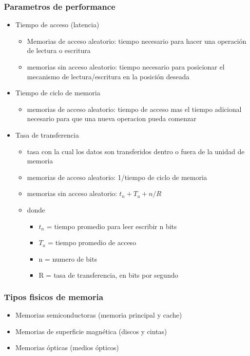 \subsubsection{Parametros de performance}
	\begin{itemize}
	\item Tiempo de acceso (latencia)
		\begin{itemize}
		\item Memorias de acceso aleatorio: tiempo necesario para hacer una operación de lectura o escritura
		\item memorias sin acceso aleatorio: tiempo necesario para posicionar el mecanismo de lectura/escritura en la posición deseada
		\end{itemize}
	\item Tiempo de ciclo de memoria
		\begin{itemize}
		\item memorias de acceso aleatorio: tiempo de acceso mas el tiempo adicional necesario para que una nueva operacion pueda comenzar
		\end{itemize}
	\item Tasa de transferencia
		\begin{itemize}
		\item tasa con la cual los datos son transferidos dentro o fuera de la unidad de memoria
		\item memorias de acceso aleatorio: 1/tiempo de ciclo de memoria
		\item memorias sin acceso aleatorio: $t_n+T_a+n/R$
		\item donde
			\begin{itemize}
			\item $t_n$ = tiempo promedio para leer escribir n bits
			\item $T_a$ = tiempo promedio de acceso
			\item n = numero de bits
			\item R = tasa de transferencia, en bits por segundo
			\end{itemize}
		\end{itemize}
	\end{itemize}

\subsubsection{Tipos fisicos de memoria}
	\begin{itemize}
	\item Memorias semiconductoras (memoria principal y cache)
	\item Memorias de superficie magnética (discos y cintas)
	\item Memorias ópticas (medios ópticos)
	\end{itemize}
	
